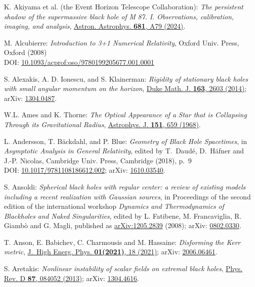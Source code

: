 \begin{thebibliography}{123}
K. Akiyama et al. (the Event Horizon Telescope Collaboration):
{\em The persistent shadow of the supermassive black hole of M 87.
I. Observations, calibration, imaging, and analysis},
\href{https://doi.org/10.1051/0004-6361/202347932}{Astron. Astrophys. {\bf 681}, A79 (2024)}.

M. Alcubierre:
{\em Introduction to 3+1 Numerical Relativity},
Oxford Univ. Press, Oxford (2008)\\
DOI: \href{https://doi.org/10.1093/acprof:oso/9780199205677.001.0001}{10.1093/acprof:oso/9780199205677.001.0001}

S. Alexakis, A. D. Ionescu, and S. Klainerman: {\em Rigidity of stationary black holes with small angular momentum on the horizon},
\href{https://doi.org/10.1215/00127094-2819517}{Duke Math. J. {\bf 163}, 2603 (2014)};
arXiv: \href{https://arxiv.org/abs/1304.0487}{1304.0487}.

W.L. Ames and K. Thorne:
{\em The Optical Appearance of a Star that is Collapsing Through its Gravitational Radius},
\href{https://doi.org/10.1086/149465}{Astrophys. J. {\bf 151}, 659 (1968)}.

L. Andersson, T. Bäckdahl, and P. Blue:
{\em Geometry of Black Hole Spacetimes},
in {\em Asymptotic Analysis in General Relativity}, edited by
T.~Daudé, D.~Häfner and J.-P. Nicolas,
Cambridge Univ. Press, Cambridge (2018), p.~9\\
DOI: \href{https://doi.org/10.1017/9781108186612.002}{10.1017/9781108186612.002};
arXiv: \href{https://arxiv.org/abs/1610.03540}{1610.03540}.

S. Ansoldi:
{\em Spherical black holes with regular center: a review of existing models including a recent realization with Gaussian sources},
in Proceedings of the second edition of the international workshop \emph{Dynamics and Thermodynamics of Blackholes and Naked Singularities}, edited by L. Fatibene, M. Francaviglia, R. Giambò and G. Magli,
published as \href{https://arxiv.org/abs/1205.2839}{arXiv:1205.2839}
(2008);
arXiv: \href{https://arxiv.org/abs/0802.0330}{0802.0330}.

T. Anson, E. Babichev, C. Charmousis and M. Hassaine:
{\em Disforming the Kerr metric},
\href{https://doi.org/10.1007/JHEP01(2021)018}{J.~High Energ. Phys. {\bf 01(2021)}, 18 (2021)};
arXiv: \href{https://arxiv.org/abs/2006.06461}{2006.06461}.

S. Aretakis:
{\em Nonlinear instability of scalar fields on extremal black holes},
\href{https://doi.org/10.1103/PhysRevD.87.084052}{Phys. Rev. D {\bf 87}, 084052 (2013)};
arXiv: \href{https://arxiv.org/abs/1304.4616}{1304.4616}.


\end{thebibliography}
